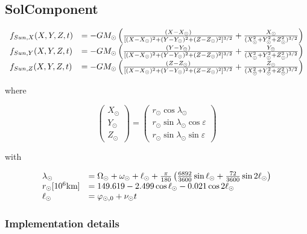 \documentclass{article}
\begin{document}
\subsection{SolComponent}

\begin{equation}
\begin{array}{ll}
f_{Sun,X}(X,Y,Z,t) &=-G M_\odot\left(
{(X-X_\odot)\over [(X-X_\odot)^2+(Y-Y_\odot)^2+(Z-Z_\odot)^2]^{3/2}}
+{X_\odot\over(X_\odot^2+Y_\odot^2+Z_\odot^2)^{3/2}} \right)\\
f_{Sun,Y}(X,Y,Z,t) &=-G M_\odot\left(
{(Y-Y_\odot)\over [(X-X_\odot)^2+(Y-Y_\odot)^2+(Z-Z_\odot)^2]^{3/2}}
+{Y_\odot\over(X_\odot^2+Y_\odot^2+Z_\odot^2)^{3/2}} \right)\\
f_{Sun,Z}(X,Y,Z,t) &=-G M_\odot\left(
{(Z-Z_\odot)\over [(X-X_\odot)^2+(Y-Y_\odot)^2+(Z-Z_\odot)^2]^{3/2}}
+{Z_\odot\over(X_\odot^2+Y_\odot^2+Z_\odot^2)^{3/2}} \right)
\end{array}
\end{equation}

where

\begin{equation}
\begin{pmatrix}
X_\odot\\
Y_\odot\\
Z_\odot
\end{pmatrix} = \begin{pmatrix}
r_\odot \cos \lambda_\odot\\
r_\odot \sin \lambda_\odot \cos \varepsilon\\
r_\odot \sin \lambda_\odot \sin \varepsilon
\end{pmatrix}
\end{equation}

with

\begin{equation}
\begin{array}{ll}
\lambda_\odot &= \Omega_\odot+\omega_\odot+\ell_{\odot}+\frac{\pi}{180}\left(
{6892\over3600} \sin \ell_{\odot} + {72\over 3600} \sin 2\ell_{\odot}\right)\\
r_\odot[10^6\mbox{km}] &=149.619-2.499 \cos \ell_{\odot} - 0.021 \cos 2\ell_{\odot}\\
\ell_{\odot} &= \varphi_{\odot,0}+\nu_\odot t
\end{array}
\end{equation}

\subsubsection{Implementation details}
\end{document}
